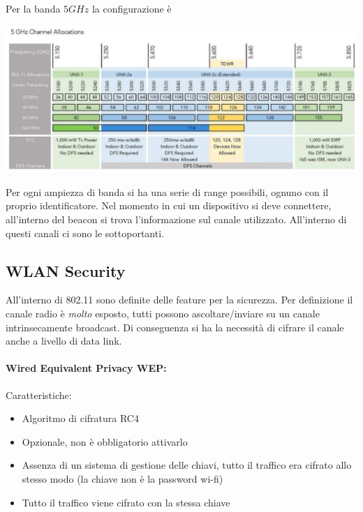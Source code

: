 Per la banda $5GHz$ la configurazione è 
\begin{center}
	\includegraphics[width=\linewidth]{img/wlan/5bande}
\end{center}

Per ogni ampiezza di banda si ha una serie di range possibili, ognuno con il proprio identificatore. Nel momento in cui un dispositivo si deve connettere, all'interno del beacon si trova l'informazione sul canale utilizzato. All'interno di questi canali ci sono le sottoportanti.

\subsection{WLAN Security}

All'interno di 802.11 sono definite delle feature per la sicurezza. Per definizione il canale radio è \textit{molto} esposto, tutti possono ascoltare/inviare su un canale intrinsecamente broadcast. Di conseguenza si ha la necessità di cifrare il canale anche a livello di data link.

\paragraph{Wired Equivalent Privacy WEP:} Caratteristiche:
\begin{itemize}
	\item Algoritmo di cifratura RC4

	\item Opzionale, non è obbligatorio attivarlo

	\item Assenza di un sistema di gestione delle chiavi, tutto il traffico era cifrato allo stesso modo (la chiave non è la password wi-fi)

	\item Tutto il traffico viene cifrato con la stessa chiave
\end{itemize}


